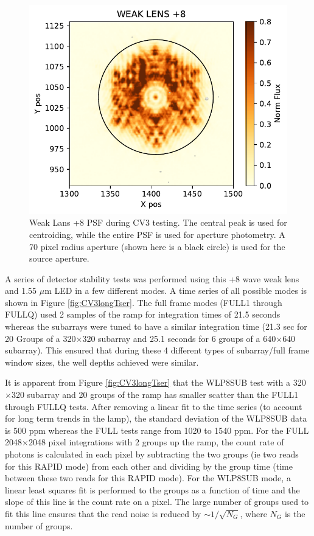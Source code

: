 \documentclass{aastex62}
\begin{document}
\begin{figure}[!hbtp]
\centering
\includegraphics[width=.49\columnwidth]{wlp8_psf.pdf}
\caption{Weak Lans +8 PSF during CV3 testing.
The central peak is used for centroiding, while the entire PSF is used for aperture photometry.
A 70 pixel radius aperture (shown here is a black circle) is used for the source aperture.}\label{fig:WLP8PSF}
\end{figure}

A series of detector stability tests was performed using this +8 wave weak lens and 1.55 $\mu$m LED in a few different modes.
A time series of all possible modes is shown in Figure \ref{fig:CV3longTser}.
The full frame modes (FULL1 through FULLQ) used 2 samples of the ramp for integration times of 21.5 seconds whereas the subarrays were tuned to have a similar integration time (21.3 sec for 20 Groups of a 320$\times$320 subarray and 25.1 seconds for 6 groups of a 640$\times$640 subarray).
This ensured that during these 4 different types of subarray/full frame window sizes, the well depths achieved were similar.

It is apparent from Figure \ref{fig:CV3longTser} that the WLP8SUB test with a 320$\times$320 subarray and 20 groups of the ramp has smaller scatter than the FULL1 through FULLQ tests.
After removing a linear fit to the time series (to account for long term trends in the lamp), the standard deviation of the WLP8SUB data is 500 ppm whereas the FULL tests range from 1020 to 1540 ppm.
For the FULL 2048$\times$2048 pixel integrations with 2 groups up the ramp, the count rate of photons is calculated in each pixel by subtracting the two groups (ie two reads for this RAPID mode) from each other and dividing by the group time (time between these two reads for this RAPID mode).
For the WLP8SUB mode, a linear least squares fit is performed to the groups as a function of time and the slope of this line is the count rate on a pixel.
The large number of groups used to fit this line ensures that the read noise is reduced by $\sim 1/\sqrt{N_G}$, where $N_G$ is the number of groups.
\end{document}

